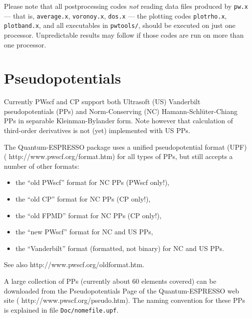 \documentclass[12pt,a4paper]{article}
\begin{document}
Please note that all postprocessing codes \emph{not} reading data
files produced by \texttt{pw.x} --- that is,
\texttt{average.x}, \texttt{voronoy.x}, \texttt{dos.x} --- the
plotting codes \texttt{plotrho.x}, \texttt{plotband.x}, and all
executables in \texttt{pwtools/}, should be executed on just one
processor.
Unpredictable results may follow if those codes are run on more than
one processor.

\clearpage

\section{Pseudopotentials}
  \label{pseudopotentials}

Currently PWscf and CP support both Ultrasoft (US) Vanderbilt
pseudopotentials (PPs) and Norm-Conserving (NC)
Hamann-Schl\"uter-Chiang PPs in separable Kleinman-Bylander form.
Note however that calculation of third-order derivatives is not (yet)
implemented with US PPs. 

The Quantum-ESPRESSO package uses a unified pseudopotential format (UPF)
(%
                   {http://www.pwscf.org/format.htm})
for all types of PPs, but still accepts a number of other formats:
\begin{itemize}
  \item the ``old PWscf'' format for NC PPs (PWscf only!),
  \item the ``old CP'' format for NC PPs (CP only!),
  \item the ``old FPMD'' format for NC PPs (CP only!),
  \item the ``new PWscf'' format for NC and US PPs,
  \item the ``Vanderbilt'' format (formatted, not binary) for NC and
        US PPs.
\end{itemize}
See also
%
                  {http://www.pwscf.org/oldformat.htm}.

A large collection of PPs (currently about 60 elements covered) can
be downloaded from the Pseudopotentials Page of the Quantum-ESPRESSO
web site
(%
                   {http://www.pwscf.org/pseudo.htm}).
The naming convention for these PPs is explained in file
\texttt{Doc/nomefile.upf}.
\end{document}
